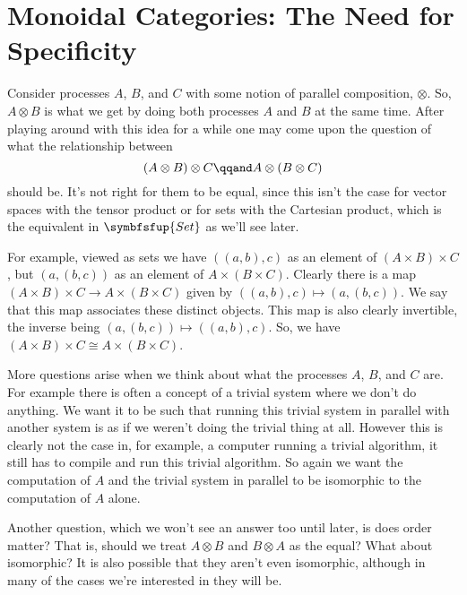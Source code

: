 \documentclass[fleqn]{NotesClass}
\makeatletter
\newcommand{\c@egory}[1]{\symbfsfup{#1}}
\newcommand{\Set}{\c@egory{Set}}
\newcommand{\isomorphic}{\cong}
\makeatother
\begin{document}
    \section{Monoidal Categories: The Need for Specificity}
    \label{sec:monoidal categories: the need for specificity}
    Consider processes \(A\), \(B\), and \(C\) with some notion of parallel composition, \(\otimes\).
    So, \(A \otimes B\) is what we get by doing both processes \(A\) and \(B\) at the same time.
    After playing around with this idea for a while one may come upon the question of what the relationship between
    \begin{equation}
        (A \otimes B) \otimes C \qqand A \otimes (B \otimes C)
    \end{equation}
    should be.
    It's not right for them to be equal, since this isn't the case for vector spaces with the tensor product or for sets with the Cartesian product, which is the equivalent in \(\Set\) as we'll see later.
    
    For example, viewed as sets we have \(((a, b), c)\) as an element of \((A \times B) \times C\), but \((a, (b, c))\) as an element of \(A \times (B \times C)\).
    Clearly there is a map \((A \times B) \times C \to A \times (B \times C)\) given by \(((a, b), c) \mapsto (a, (b, c))\).
    We say that this map associates these distinct objects.
    This map is also clearly invertible, the inverse being \((a, (b, c)) \mapsto ((a, b), c)\).
    So, we have \((A \times B) \times C \isomorphic A \times (B \times C)\).
    
    More questions arise when we think about what the processes \(A\), \(B\), and \(C\) are.
    For example there is often a concept of a trivial system where we don't do anything.
    We want it to be such that running this trivial system in parallel with another system is as if we weren't doing the trivial thing at all.
    However this is clearly not the case in, for example, a computer running a trivial algorithm, it still has to compile and run this trivial algorithm.
    So again we want the computation of \(A\) and the trivial system in parallel to be isomorphic to the computation of \(A\) alone.
    
    Another question, which we won't see an answer too until later, is does order matter?
    That is, should we treat \(A \otimes B\) and \(B \otimes A\) as the equal?
    What about isomorphic?
    It is also possible that they aren't even isomorphic, although in many of the cases we're interested in they will be.
    
\end{document}
